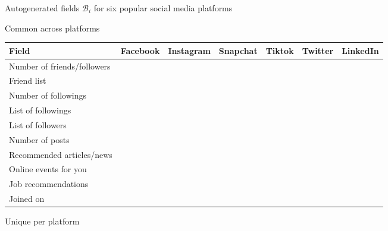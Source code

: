 \documentclass[11pt]{article} %
\newcommand{\cmark}{\ding{51}}%
\begin{document}
\begin{figure}[tb]
\small
    \caption{Autogenerated fields $\mathcal{B}_i$ for six popular social media platforms}
    \label{tab:autogenerate}
  \begin{minipage}{\textwidth}
        \centering
        \caption{Common across platforms}
        \label{tab:autogenerate-a}
            \begin{tabular}{lcccccc} 
            \toprule
Field &   Facebook &   Instagram &   Snapchat &   Tiktok &   Twitter &   LinkedIn \\ \midrule    
Number of friends/followers & \cmark    & \cmark     &          & \cmark  & \cmark   & \cmark    \\\hline
Friend list                 & \cmark    &           &          &        &         & \cmark    \\\hline
Number of followings        & \cmark    & \cmark     &          & \cmark  & \cmark   &          \\\hline
List of followings          & \cmark    & \cmark     &          &        & \cmark   &          \\\hline
List of followers           &          & \cmark     &          &        & \cmark   &          \\\hline
Number of posts             &          & \cmark     &          &        & \cmark   &          \\\hline
Recommended articles/news   & \cmark    &           & \cmark    &        & \cmark   & \cmark    \\\hline
Online events for you       & \cmark    &           &          &        &         & \cmark    \\\hline
Job recommendations         & \cmark    &           &          &        &         & \cmark    \\\hline
Joined on                   &          &           & \cmark    &        & \cmark   &         \\ \bottomrule
            \end{tabular} 
    \end{minipage}%
    \vspace{1em}
    \begin{minipage}{\textwidth}      
        \centering
        \caption{Unique per platform}

\end{minipage}
\end{figure}
\end{document}
